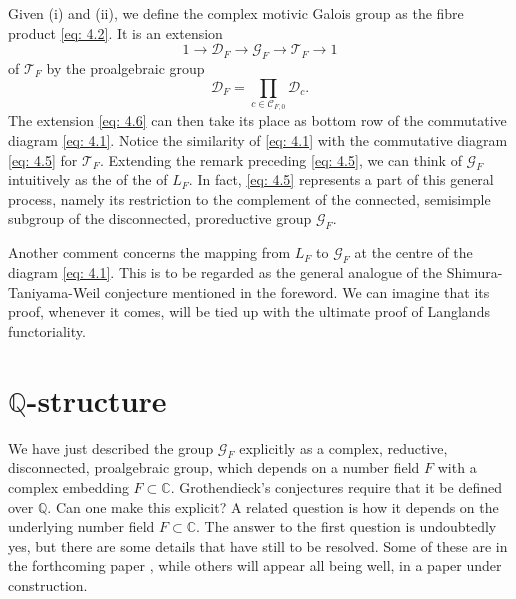 \documentclass[preprint,12pt, leqno]{elsarticle}
\newcommand{\UGal}{\mathcal{G}_F}
\newcommand{\mQ}{\mathbb{Q}}
\newcommand{\mC}{\mathbb{C}}
\newcommand{\cT}{\mathcal{T}}
\numberwithin{equation}{section}
\theoremstyle{named}
\begin{document}
Given (i) and (ii), we define the complex motivic Galois group as the fibre product \eqref{eq: 4.2}. It is an extension
\begin{equation}\label{eq: 4.6}
    1 \longrightarrow \mathcal{D}_F \longrightarrow \mathcal{G}_F \longrightarrow \mathcal{T}_F \longrightarrow 1
\end{equation}
of $\cT_F$ by the proalgebraic group
\begin{equation}\label{eq: 4.7}
    \mathcal{D}_F = \prod_{c\in\mathcal{C}_{F,0}}\mathcal{D}_c.
\end{equation}
The extension \eqref{eq: 4.6} can then take its place as bottom row of the commutative diagram \eqref{eq: 4.1}. Notice the similarity of \eqref{eq: 4.1} with the commutative diagram \eqref{eq: 4.5} for $\cT_F$. Extending the remark preceding \eqref{eq: 4.5}, we can think of $\UGal$ intuitively as the  of the  of $L_F$. In fact, \eqref{eq: 4.5} represents a part of this general process, namely its restriction to the complement of the connected, semisimple subgroup of the disconnected, proreductive group $\UGal$.

Another comment concerns the mapping from $L_F$ to $\UGal$ at the centre of the diagram \eqref{eq: 4.1}. This is to be regarded as the general analogue of the Shimura-Taniyama-Weil conjecture mentioned in the foreword. We can imagine that its proof, whenever it comes, will be tied up with the ultimate proof of Langlands functoriality.
\section{$\mQ$-structure}\label{sec: Q structure}

We have just described the group $\UGal$ explicitly as a complex, reductive, disconnected, proalgebraic group, which depends on a number field $F$ with a complex embedding $F\subset\mC$. Grothendieck's conjectures require that it be defined over $\mQ$. Can one make this explicit? A related question is how it depends on the underlying number field $F\subset \mC$. The answer to the first question is undoubtedly yes, but there are some details that have still to be resolved. Some of these are in the forthcoming paper \cite{N2}, while others will appear all being well, in a paper \cite{N14} under construction.
\end{document}
